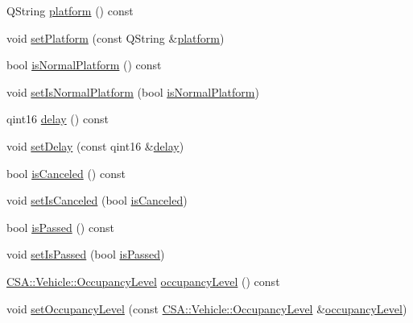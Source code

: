 \begin{DoxyCompactItemize}
\item 
Q\+String \mbox{\hyperlink{classCSA_1_1RouteLegEnd_a3ae0babc5849e36e2df61410da6a1cdd}{platform}} () const
\item 
void \mbox{\hyperlink{classCSA_1_1RouteLegEnd_abe99ad7c60f04350b460f1029ae2691d}{set\+Platform}} (const Q\+String \&\mbox{\hyperlink{classCSA_1_1RouteLegEnd_a3ae0babc5849e36e2df61410da6a1cdd}{platform}})
\item 
bool \mbox{\hyperlink{classCSA_1_1RouteLegEnd_a516ce67088e866a951fde382dba4e9e2}{is\+Normal\+Platform}} () const
\item 
void \mbox{\hyperlink{classCSA_1_1RouteLegEnd_a4a566505d3fb26d072e94b47a8c798bc}{set\+Is\+Normal\+Platform}} (bool \mbox{\hyperlink{classCSA_1_1RouteLegEnd_a516ce67088e866a951fde382dba4e9e2}{is\+Normal\+Platform}})
\item 
qint16 \mbox{\hyperlink{classCSA_1_1RouteLegEnd_ab1ea8c249d0a40884f446639ab030bc3}{delay}} () const
\item 
void \mbox{\hyperlink{classCSA_1_1RouteLegEnd_a39d7483632dc0703029ba8ea93390a45}{set\+Delay}} (const qint16 \&\mbox{\hyperlink{classCSA_1_1RouteLegEnd_ab1ea8c249d0a40884f446639ab030bc3}{delay}})
\item 
bool \mbox{\hyperlink{classCSA_1_1RouteLegEnd_aca61ef191ba822aaed436707da242ef3}{is\+Canceled}} () const
\item 
void \mbox{\hyperlink{classCSA_1_1RouteLegEnd_a73d8392ad94a85d85784ef6916282713}{set\+Is\+Canceled}} (bool \mbox{\hyperlink{classCSA_1_1RouteLegEnd_aca61ef191ba822aaed436707da242ef3}{is\+Canceled}})
\item 
bool \mbox{\hyperlink{classCSA_1_1RouteLegEnd_a5359a35f5b132be17444fe8d1090671f}{is\+Passed}} () const
\item 
void \mbox{\hyperlink{classCSA_1_1RouteLegEnd_a2a279d3b89f1d5847cd4e8ec575b488f}{set\+Is\+Passed}} (bool \mbox{\hyperlink{classCSA_1_1RouteLegEnd_a5359a35f5b132be17444fe8d1090671f}{is\+Passed}})
\item 
\mbox{\hyperlink{classCSA_1_1Vehicle_a331cc81107e5f0a8f37f894729dd9bda}{C\+S\+A\+::\+Vehicle\+::\+Occupancy\+Level}} \mbox{\hyperlink{classCSA_1_1RouteLegEnd_aec102317dd7705a8b62b4ec8ee08597f}{occupancy\+Level}} () const
\item 
void \mbox{\hyperlink{classCSA_1_1RouteLegEnd_a78147d9dfa7d02060aea3f3d34e76eae}{set\+Occupancy\+Level}} (const \mbox{\hyperlink{classCSA_1_1Vehicle_a331cc81107e5f0a8f37f894729dd9bda}{C\+S\+A\+::\+Vehicle\+::\+Occupancy\+Level}} \&\mbox{\hyperlink{classCSA_1_1RouteLegEnd_aec102317dd7705a8b62b4ec8ee08597f}{occupancy\+Level}})
\end{DoxyCompactItemize}
